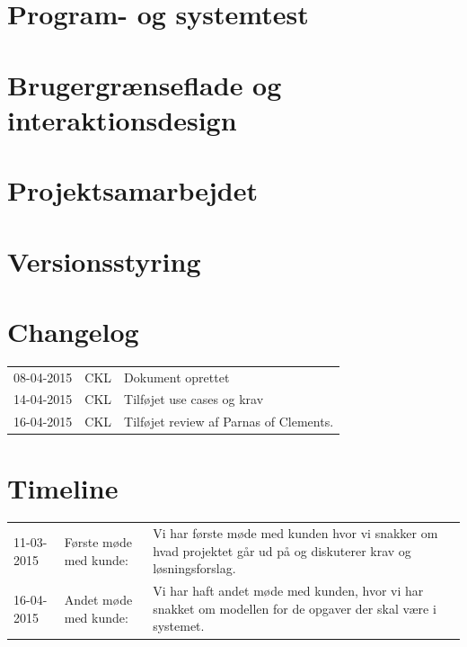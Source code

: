 \documentclass[12pt]{article}
\begin{document}
\section{Program- og systemtest}
\label{sec:program_og_systemtest}

\section{Brugergrænseflade og interaktionsdesign}

\section{Projektsamarbejdet}
\label{sec:projektsamarbejdet}

\appendix
\section{Versionsstyring}

\section{Changelog}
\begin{tabular}{l l l}
08-04-2015 & CKL & Dokument oprettet \\
14-04-2015 & CKL & Tilføjet use cases og krav \\
16-04-2015 & CKL & Tilføjet review af Parnas of Clements. \\
\end{tabular}

\section{Timeline}
\begin{tabular}{l l p{8cm}}
11-03-2015 & Første møde med kunde: & Vi har første møde med kunden hvor vi snakker om hvad projektet går ud på og diskuterer krav og løsningsforslag. \\
16-04-2015 & Andet møde med kunde: & Vi har haft andet møde med kunden, hvor vi har snakket om modellen for de opgaver der skal være i systemet. \\
\end{tabular}


{}
\end{document}
